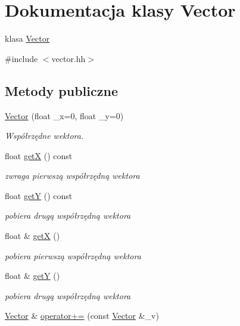 \hypertarget{class_vector}{}\section{Dokumentacja klasy Vector}
\label{class_vector}


klasa \hyperlink{class_vector}{Vector}  




{\ttfamily \#include $<$vector.\+hh$>$}

\subsection*{Metody publiczne}
\begin{DoxyCompactItemize}
\item 
\hyperlink{class_vector_af3c1b04bfbb10e29433842202365a6c4}{Vector} (float \+\_\+x=0, float \+\_\+y=0)
\begin{DoxyCompactList}\small\item\em Współrzędne wektora. \end{DoxyCompactList}\item 
float \hyperlink{class_vector_ab2878a1bb81982dc83363646e25ce665}{get\+X} () const 
\begin{DoxyCompactList}\small\item\em zwraga pierwszą współrzędną wektora \end{DoxyCompactList}\item 
float \hyperlink{class_vector_a86293fe7a035979fd252be6071488b6a}{get\+Y} () const 
\begin{DoxyCompactList}\small\item\em pobiera drugą współrzędną wektora \end{DoxyCompactList}\item 
float \& \hyperlink{class_vector_aeca06c929d4ab3078a828723a88621e6}{get\+X} ()
\begin{DoxyCompactList}\small\item\em pobiera pierwszą współrzędną wektora \end{DoxyCompactList}\item 
float \& \hyperlink{class_vector_ab0cc77ce300a60de0ab734555886ad5d}{get\+Y} ()
\begin{DoxyCompactList}\small\item\em pobiera drugą współrzędną wektora \end{DoxyCompactList}\item 
\hyperlink{class_vector}{Vector} \& \hyperlink{class_vector_a4eeab5be24ee846de3012e67a4e34820}{operator+=} (const \hyperlink{class_vector}{Vector} \&\+\_\+v)

\end{DoxyCompactItemize}
